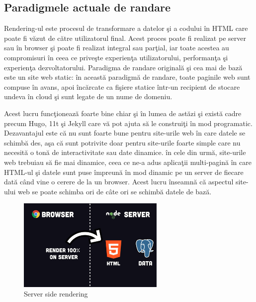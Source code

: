 \documentclass[12pt, a4paper]{report}
\begin{document}
\subsection{Paradigmele actuale de randare}

Rendering-ul este procesul de transformare a datelor \c si a codului \^ in HTML care poate fi v\u azut de c\u atre utilizatorul final. Acest proces poate fi realizat pe server sau \^ in browser \c si poate fi realizat integral sau par\c tial, iar toate acestea au compromisuri \^ in ceea ce prive\c ste experien\c ta utilizatorului, performan\c ta \c si experien\c ta dezvoltatorului. Paradigma de randare original\u a \c si cea mai de baz\u a este un site web static: \^ in aceast\u a paradigm\u a de randare, toate paginile web sunt compuse \^ in avans, apoi \^ inc\u arcate ca fi\c siere statice \^ intr-un recipient de stocare undeva \^ in cloud \c si sunt legate de un nume de domeniu.

Acest lucru func\c tioneaz\u a foarte bine chiar \c si \^ in lumea de ast\u azi \c si exist\u a cadre precum Hugo, 11t \c si Jekyll care v\u a pot ajuta s\u a le construi\c ti \^ in mod programatic. Dezavantajul este c\u a nu sunt foarte bune pentru site-urile web \^ in care datele se schimb\u a des, a\c sa c\u a sunt potrivite doar pentru site-urile foarte simple care nu necesit\u a o ton\u a de interactivitate sau date dinamice. \^ in cele din urm\u a, site-urile web trebuiau s\u a fie mai dinamice, ceea ce ne-a adus aplica\c tii multi-pagin\u a \^ in care HTML-ul \c si datele sunt puse \^ impreun\u a \^ in mod dinamic pe un server de fiecare dat\u a c\^ and vine o cerere de la un browser. Acest lucru \^ inseamn\u a c\u a aspectul site-ului web se poate schimba ori de c\^ ate ori se schimb\u a datele de baz\u a. \cite{benefitsserverrendering}

\begin{figure}[htbp]
	\centering
	\includegraphics[width=0.63\textwidth]{37.png}
	\caption{Server side rendering}
	\label{fig:server rendering}
\end{figure}
\end{document}

